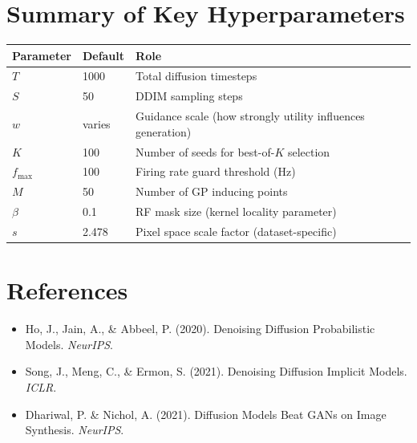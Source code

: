 \documentclass[11pt]{article}
\begin{document}
\section{Summary of Key Hyperparameters}

\begin{center}
\begin{tabular}{@{}llp{7cm}@{}}
\toprule
Parameter & Default & Role \\
\midrule
$T$ & 1000 & Total diffusion timesteps \\
$S$ & 50 & DDIM sampling steps \\
$w$ & varies & Guidance scale (how strongly utility influences generation) \\
$K$ & 100 & Number of seeds for best-of-$K$ selection \\
$f_{\max}$ & 100 & Firing rate guard threshold (Hz) \\
$M$ & 50 & Number of GP inducing points \\
$\beta$ & 0.1 & RF mask size (kernel locality parameter) \\
$s$ & 2.478 & Pixel space scale factor (dataset-specific) \\
\bottomrule
\end{tabular}
\end{center}


\section*{References}

\begin{itemize}
\item Ho, J., Jain, A., \& Abbeel, P. (2020).
  Denoising Diffusion Probabilistic Models. \textit{NeurIPS}.
\item Song, J., Meng, C., \& Ermon, S. (2021).
  Denoising Diffusion Implicit Models. \textit{ICLR}.
\item Dhariwal, P. \& Nichol, A. (2021).
  Diffusion Models Beat GANs on Image Synthesis. \textit{NeurIPS}.
\end{itemize}
\end{document}
